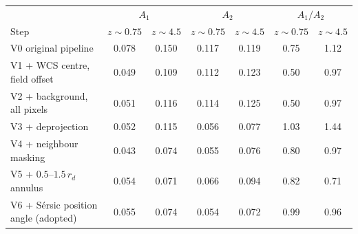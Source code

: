 \begin{tabular}{lcccccc}
\toprule
 & \multicolumn{2}{c}{$A_1$} & \multicolumn{2}{c}{$A_2$} & \multicolumn{2}{c}{$A_1/A_2$}\\
Step & $z\sim0.75$ & $z\sim4.5$ & $z\sim0.75$ & $z\sim4.5$ & $z\sim0.75$ & $z\sim4.5$\\
\midrule
V0 original pipeline & 0.078 & 0.150 & 0.117 & 0.119 & 0.75 & 1.12\\
V1 + WCS centre, field offset & 0.049 & 0.109 & 0.112 & 0.123 & 0.50 & 0.97\\
V2 + background, all pixels & 0.051 & 0.116 & 0.114 & 0.125 & 0.50 & 0.97\\
V3 + deprojection & 0.052 & 0.115 & 0.056 & 0.077 & 1.03 & 1.44\\
V4 + neighbour masking & 0.043 & 0.074 & 0.055 & 0.076 & 0.80 & 0.97\\
V5 + $0.5$--$1.5\,r_d$ annulus & 0.054 & 0.071 & 0.066 & 0.094 & 0.82 & 0.71\\
V6 + S\'ersic position angle (adopted) & 0.055 & 0.074 & 0.054 & 0.072 & 0.99 & 0.96\\
\bottomrule
\end{tabular}
